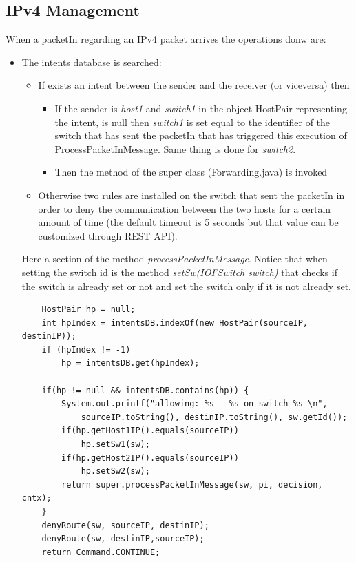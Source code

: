 \documentclass[a4paper]{report}
\begin{document}
	\subsection{IPv4 Management}\label{sec:Ipv4}
	\noindent When a packetIn regarding an IPv4 packet arrives the operations donw are:
	\begin{itemize}
		\item The intents database is searched:
		\begin{itemize}
			\item If exists an intent between the sender and the receiver (or viceversa) then
			\begin{itemize}
				\item If the sender is \textit{host1} and \textit{switch1} in the object HostPair representing the intent, is null then \textit{switch1} is set equal to the identifier of the switch that has sent the packetIn that has triggered this execution of ProcessPacketInMessage. Same thing is done for \textit{switch2}. 
				\item Then the method of the super class (Forwarding.java) is invoked 
			\end{itemize} 
			\item Otherwise two rules are installed on the switch that sent the packetIn in order to deny the communication between the two hosts for a certain amount of time (the default timeout is 5 seconds but that value can be customized through REST API).
		\end{itemize}
	\noindent Here a section of the method \textit{processPacketInMessage}. Notice that when setting the switch id is the method \textit{setSw(IOFSwitch switch)} that checks if the switch is already set or not and set the switch only if it is not already set.
	\begin{lstlisting}
	HostPair hp = null;
	int hpIndex = intentsDB.indexOf(new HostPair(sourceIP, destinIP));
	if (hpIndex != -1)
		hp = intentsDB.get(hpIndex);
		
	if(hp != null && intentsDB.contains(hp)) {
		System.out.printf("allowing: %s - %s on switch %s \n",
			sourceIP.toString(), destinIP.toString(), sw.getId());	
		if(hp.getHost1IP().equals(sourceIP))
			hp.setSw1(sw);
		if(hp.getHost2IP().equals(sourceIP))
			hp.setSw2(sw);
		return super.processPacketInMessage(sw, pi, decision, cntx);	
	}
	denyRoute(sw, sourceIP, destinIP);
	denyRoute(sw, destinIP,sourceIP);
	return Command.CONTINUE;
	\end{lstlisting}
	\end{itemize}
\end{document}
